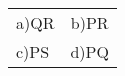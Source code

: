  \setlength{\tabcolsep}{80pt}
 \renewcommand{\arraystretch}{2}
 
  \begin{tabular}{l c}
       a)QR & b)PR \\
       c)PS & d)PQ
  \end{tabular}
